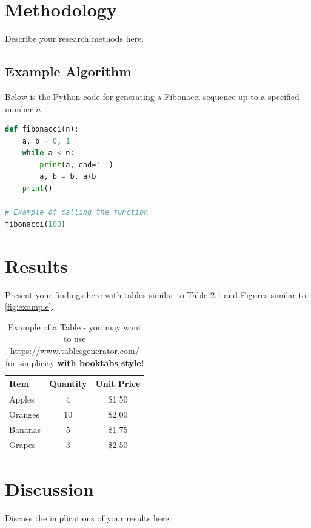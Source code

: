 \documentclass[12pt,a4paper]{report}
\begin{document}
\chapter{Methodology}
\label{ch:methodology}
Describe your research methods here.

\section{Example Algorithm}
Below is the Python code for generating a Fibonacci sequence up to a specified number \( n \):

\begin{lstlisting}[language=Python, caption=Fibonacci Sequence in Python]
def fibonacci(n):
    a, b = 0, 1
    while a < n:
        print(a, end=' ')
        a, b = b, a+b
    print()

# Example of calling the function
fibonacci(100)
\end{lstlisting}

\chapter{Results}
\label{ch:results}

Present your findings here with tables similar to Table \ref{tab:results} and Figures similar to \ref{fig:example}.

\begin{table}[htbp]
\centering

\begin{tabular}{@{}lcc@{}} %
\toprule
\textbf{Item} & \textbf{Quantity} & \textbf{Unit Price} \\
\midrule
Apples & 4 & \$1.50 \\
Oranges & 10 & \$2.00 \\
Bananas & 5 & \$1.75 \\
Grapes & 3 & \$2.50 \\
\bottomrule
\end{tabular}
\caption{Example of a Table - you may want to use \url{https://www.tablesgenerator.com/} for simplicity \textbf{with booktabs style!}}
\label{tab:results}
\end{table}

\chapter{Discussion}
\label{ch:discussion}
Discuss the implications of your results here.
\end{document}
